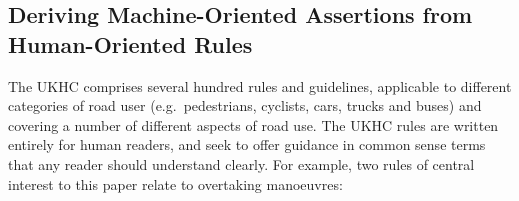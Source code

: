 
\subsection{Deriving Machine-Oriented Assertions from Human-Oriented Rules}
\label{interp_nat_lang_UKHC_rules}%

The UKHC comprises several hundred rules and guidelines, applicable to different categories of road user 
(e.g.\ pedestrians, cyclists, cars, trucks and buses) 
and covering a number of different aspects of road use. 
The UKHC rules are written entirely for human readers, and seek to offer guidance in common sense terms that any reader should understand clearly. For example, two rules of central interest to this paper relate to overtaking manoeuvres:

